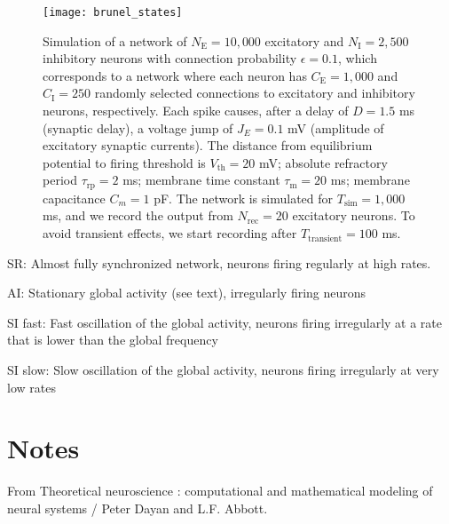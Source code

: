 \begin{figure}[H]
    \centering
    \texttt{[image: brunel\_states]}
    \caption{Simulation of a network of $N_\mathrm{E}=10,000$ excitatory and $N_\mathrm{I} = 2,500$ inhibitory neurons with connection probability $\epsilon = 0.1$, which corresponds to a network where each neuron has $C_\mathrm{E}=1,000$ and $C_\mathrm{I}=250$ randomly selected connections to excitatory and inhibitory neurons, respectively. Each spike causes, after a delay of $D=1.5$ ms (synaptic delay), a voltage jump of $J_E = 0.1$ mV (amplitude of excitatory synaptic currents). The distance from equilibrium potential to firing threshold is $V_\mathrm{th} = 20$ mV; absolute refractory period $\tau_\mathrm{rp} = 2$ ms; membrane time constant $\tau_\mathrm{m}=20$ ms; membrane capacitance $C_m = 1$ pF. The network is simulated for $T_\mathrm{sim} = 1,000$ ms, and we record the output from $N_\mathrm{rec} = 20$ excitatory neurons. To avoid transient effects, we start recording after $T_\mathrm{transient} = 100$ ms. 
    }
    \label{fig:brunel_states}
\end{figure}


SR: Almost fully synchronized network, neurons firing regularly at high rates.

AI: Stationary global activity (see text), irregularly firing neurons

SI fast: Fast oscillation of the global activity, neurons firing irregularly at a rate that is lower than the global frequency

SI slow: Slow oscillation of the global activity, neurons firing irregularly at very low rates



\section{Notes}


From Theoretical neuroscience : computational and mathematical modeling of neural
systems / Peter Dayan and L.F. Abbott.


